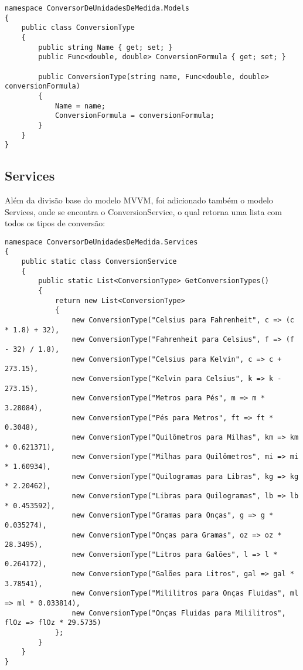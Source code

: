 \documentclass[
	12pt,				%
	oneside,			%
	a4paper,			%
	english,			%
	brazil,				%
	]{abntex2}
\begin{document}
{\begin{verbatim}
namespace ConversorDeUnidadesDeMedida.Models
{
    public class ConversionType
    {
        public string Name { get; set; }
        public Func<double, double> ConversionFormula { get; set; }

        public ConversionType(string name, Func<double, double> conversionFormula)
        {
            Name = name;
            ConversionFormula = conversionFormula;
        }
    }
}
\end{verbatim}

\subsection{Services}

Além da divisão base do modelo MVVM, foi adicionado também o modelo Services, onde se encontra o ConversionService, o qual retorna uma lista com todos os tipos de conversão:

\begin{verbatim}
namespace ConversorDeUnidadesDeMedida.Services
{
    public static class ConversionService
    {
        public static List<ConversionType> GetConversionTypes()
        {
            return new List<ConversionType>
            {
                new ConversionType("Celsius para Fahrenheit", c => (c * 1.8) + 32),
                new ConversionType("Fahrenheit para Celsius", f => (f - 32) / 1.8),
                new ConversionType("Celsius para Kelvin", c => c + 273.15),
                new ConversionType("Kelvin para Celsius", k => k - 273.15),
                new ConversionType("Metros para Pés", m => m * 3.28084),
                new ConversionType("Pés para Metros", ft => ft * 0.3048),
                new ConversionType("Quilômetros para Milhas", km => km * 0.621371),
                new ConversionType("Milhas para Quilômetros", mi => mi * 1.60934),
                new ConversionType("Quilogramas para Libras", kg => kg * 2.20462),
                new ConversionType("Libras para Quilogramas", lb => lb * 0.453592),
                new ConversionType("Gramas para Onças", g => g * 0.035274),
                new ConversionType("Onças para Gramas", oz => oz * 28.3495),
                new ConversionType("Litros para Galões", l => l * 0.264172),
                new ConversionType("Galões para Litros", gal => gal * 3.78541),
                new ConversionType("Mililitros para Onças Fluidas", ml => ml * 0.033814),
                new ConversionType("Onças Fluidas para Mililitros", flOz => flOz * 29.5735)
            };
        }
    }
}
\end{verbatim}

}
\end{document}
